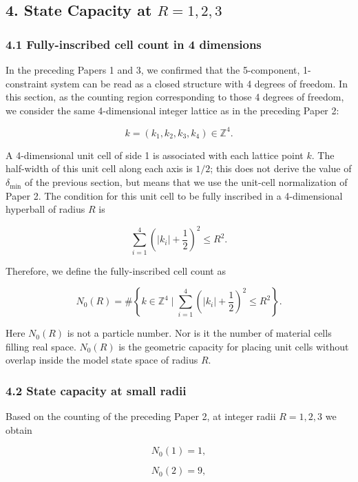 \documentclass[
]{article}
\begin{document}
\subsection{\texorpdfstring{4. State Capacity at
\(R=1,2,3\)}{4. State Capacity at R=1,2,3}}\label{state-capacity-at-r123}

\subsubsection{4.1 Fully-inscribed cell count in 4
dimensions}\label{fully-inscribed-cell-count-in-4-dimensions}

In the preceding Papers 1 and 3, we confirmed that the 5-component,
1-constraint system can be read as a closed structure with 4 degrees of
freedom. In this section, as the counting region corresponding to those
4 degrees of freedom, we consider the same 4-dimensional integer lattice
as in the preceding Paper 2:

\[
k=(k_1,k_2,k_3,k_4)\in\mathbb{Z}^4.
\]

A 4-dimensional unit cell of side 1 is associated with each lattice
point \(k\). The half-width of this unit cell along each axis is
\(1/2\); this does not derive the value of \(\delta_{\min}\) of the
previous section, but means that we use the unit-cell normalization of
Paper 2. The condition for this unit cell to be fully inscribed in a
4-dimensional hyperball of radius \(R\) is

\[
\sum_{i=1}^{4}\left(|k_i|+\frac12\right)^2\le R^2.
\]

Therefore, we define the fully-inscribed cell count as

\[
N_0(R)=\#\left\{k\in\mathbb{Z}^4\mid
\sum_{i=1}^{4}\left(|k_i|+\frac12\right)^2\le R^2
\right\}.
\]

Here \(N_0(R)\) is not a particle number. Nor is it the number of
material cells filling real space. \(N_0(R)\) is the geometric capacity
for placing unit cells without overlap inside the model state space of
radius \(R\).

\subsubsection{4.2 State capacity at small
radii}\label{state-capacity-at-small-radii}

Based on the counting of the preceding Paper 2, at integer radii
\(R=1,2,3\) we obtain

\[
N_0(1)=1,
\]

\[
N_0(2)=9,
\]
\end{document}
